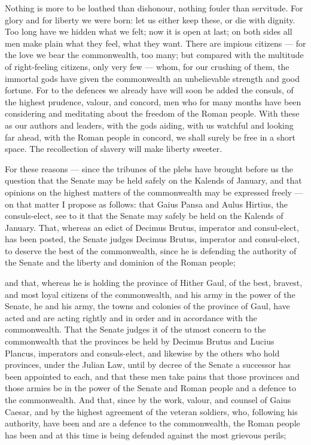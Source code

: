  Nothing is more to be loathed than dishonour, nothing fouler than servitude. For glory and for liberty we were born: let us either keep these, or die with dignity. Too long have we hidden what we felt; now it is open at last; on both sides all men make plain what they feel, what they want. There are impious citizens --- for the love we bear the commonwealth, too many; but compared with the multitude of right-feeling citizens, only very few --- whom, for our crushing of them, the immortal gods have given the commonwealth an unbelievable strength and good fortune. For to the defences we already have will soon be added the consuls, of the highest prudence, valour, and concord, men who for many months have been considering and meditating about the freedom of the Roman people. With these as our authors and leaders, with the gods aiding, with us watchful and looking far ahead, with the Roman people in concord, we shall surely be free in a short space. The recollection of slavery will make liberty sweeter.

 For these reasons --- since the tribunes of the plebs have brought before us the question that the Senate may be held safely on the Kalends of January, and that opinions on the highest matters of the commonwealth may be expressed freely --- on that matter I propose as follows: that Gaius Pansa and Aulus Hirtius, the consuls-elect, see to it that the Senate may safely be held on the Kalends of January. That, whereas an edict of Decimus Brutus, imperator and consul-elect, has been posted, the Senate judges Decimus Brutus, imperator and consul-elect, to deserve the best of the commonwealth, since he is defending the authority of the Senate and the liberty and dominion of the Roman people;

 and that, whereas he is holding the province of Hither Gaul, of the best, bravest, and most loyal citizens of the commonwealth, and his army in the power of the Senate, he and his army, the towns and colonies of the province of Gaul, have acted and are acting rightly and in order and in accordance with the commonwealth. That the Senate judges it of the utmost concern to the commonwealth that the provinces be held by Decimus Brutus and Lucius Plancus, imperators and consuls-elect, and likewise by the others who hold provinces, under the Julian Law, until by decree of the Senate a successor has been appointed to each, and that these men take pains that those provinces and those armies be in the power of the Senate and Roman people and a defence to the commonwealth. And that, since by the work, valour, and counsel of Gaius Caesar, and by the highest agreement of the veteran soldiers, who, following his authority, have been and are a defence to the commonwealth, the Roman people has been and at this time is being defended against the most grievous perils;

